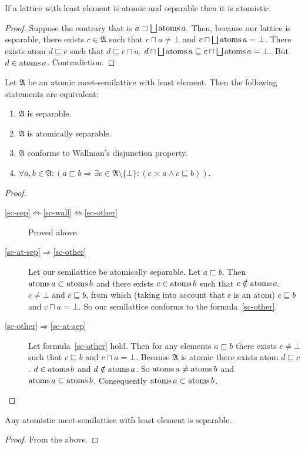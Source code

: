 \begin{thm}
\label{atomistic-enough}If a lattice with least element is atomic
and separable then it is atomistic.\end{thm}
\begin{proof}
Suppose the contrary that is $a\sqsupset\bigsqcup\operatorname{atoms} a$. Then,
because our lattice is separable, there exists $c\in\mathfrak{A}$
such that $c\sqcap a\neq\bot$ and $c\sqcap\bigsqcup\operatorname{atoms} a=\bot$.
There exists atom $d\sqsubseteq c$ such that $d\sqsubseteq c\sqcap a$.
$d\sqcap\bigsqcup\operatorname{atoms} a\sqsubseteq c\sqcap\bigsqcup\operatorname{atoms} a=\bot$.
But $d\in\operatorname{atoms} a$. Contradiction.\end{proof}
\begin{thm}
\label{sep-conds}Let $\mathfrak{A}$ be an atomic meet-semilattice
with least element. Then the following statements are equivalent:
\begin{enumerate}
\item \label{sc-sep}$\mathfrak{A}$ is separable.
\item \label{sc-at-sep}$\mathfrak{A}$ is atomically separable.
\item \label{sc-wall}$\mathfrak{A}$ conforms to Wallman's disjunction
property.
\item \label{sc-other}$\forall a,b\in\mathfrak{A}:(a\sqsubset b\Rightarrow\exists c\in\mathfrak{A}\setminus\{\bot\}:(c\asymp a\land c\sqsubseteq b))$.
\end{enumerate}
\end{thm}
\begin{proof}
~
\begin{description}
\item [{\ref{sc-sep}$\Leftrightarrow$\ref{sc-wall}$\Leftrightarrow$\ref{sc-other}}] Proved
above.
\item [{\ref{sc-at-sep}$\Rightarrow$\ref{sc-other}}] Let our semilattice
be atomically separable. Let $a\sqsubset b$. Then $\operatorname{atoms} a\subset\operatorname{atoms} b$
and there exists $c\in\operatorname{atoms} b$ such that $c\notin\operatorname{atoms} a$. $c\neq\bot$
and $c\sqsubseteq b$, from which (taking into account that $c$ is
an atom) $c\sqsubseteq b$ and $c\sqcap a=\bot$. So our semilattice
conforms to the formula~\ref{sc-other}.
\item [{\ref{sc-other}$\Rightarrow$\ref{sc-at-sep}}] Let formula~\ref{sc-other}
hold. Then for any elements $a\sqsubset b$ there exists $c\neq\bot$
such that $c\sqsubseteq b$ and $c\sqcap a=\bot$. Because $\mathfrak{A}$
is atomic there exists atom $d\sqsubseteq c$. $d\in\operatorname{atoms} b$ and
$d\notin\operatorname{atoms} a$. So $\operatorname{atoms} a\neq\operatorname{atoms} b$ and $\operatorname{atoms} a\subseteq\operatorname{atoms} b$.
Consequently $\operatorname{atoms} a\subset\operatorname{atoms} b$.
\end{description}
\end{proof}
\begin{thm}
\label{atom-is-sep}Any atomistic meet-semilattice with least element
is separable.\end{thm}
\begin{proof}
From the above.
\end{proof}

